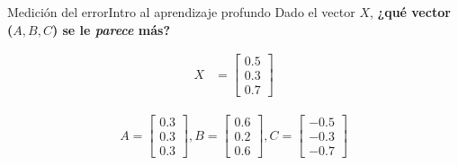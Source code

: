 \documentclass[10pt,border=3pt,tikz]{beamer}
\begin{document}
    \begin{frame}{Medición del error}{Intro al aprendizaje profundo}
        Dado el vector $X$, \textbf{¿qué vector ($A, B, C$) se le \textit{parece} más?}
        
        \begin{align*}
            X &= \begin{bmatrix}
                0.5 \\
                0.3 \\
                0.7
            \end{bmatrix}
        \end{align*}
        
        \begin{align*}
            A = \begin{bmatrix}
                0.3 \\
                0.3 \\
                0.3
            \end{bmatrix},
            B = \begin{bmatrix}
                0.6 \\
                0.2 \\
                0.6
            \end{bmatrix},
            C = \begin{bmatrix}
                -0.5 \\
                -0.3 \\
                -0.7
            \end{bmatrix}
        \end{align*}
    \end{frame}
    
\end{document}

